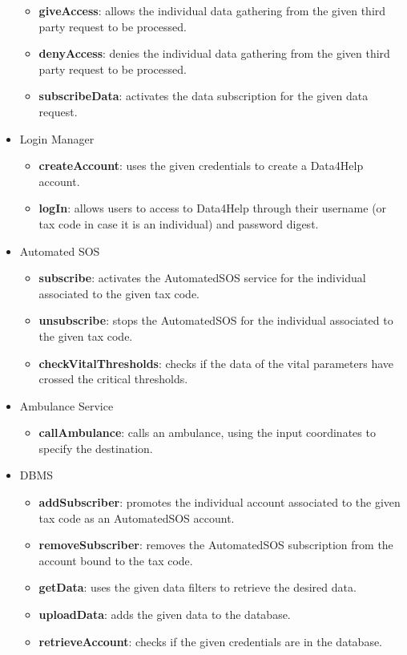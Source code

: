 \begin{itemize}
\begin{itemize}
\item \textbf{giveAccess}: allows the individual data gathering from the given third party request to be processed.
\item \textbf{denyAccess}: denies the individual data gathering from the given third party request to be processed.
\item \textbf{subscribeData}: activates the data subscription for the given data request.
\end{itemize}
\item Login Manager
\begin{itemize}
\item \textbf{createAccount}: uses the given credentials to create a Data4Help account.
\item \textbf{logIn}: allows users to access to Data4Help through their username (or tax code in case it is an individual) and password digest.
\end{itemize}
\item Automated SOS
\begin{itemize}
\item \textbf{subscribe}: activates the AutomatedSOS service for the individual associated to the given tax code.
\item \textbf{unsubscribe}: stops the AutomatedSOS for the individual associated to the given tax code.
\item \textbf{checkVitalThresholds}: checks if the data of the vital parameters have crossed the critical thresholds.
\end{itemize}
\item Ambulance Service
\begin{itemize}
\item \textbf{callAmbulance}: calls an ambulance, using the input coordinates to specify the destination.
\end{itemize}
\item DBMS
\begin{itemize}
\item \textbf{addSubscriber}: promotes the individual account associated to the given tax code as an AutomatedSOS account.
\item \textbf{removeSubscriber}: removes the AutomatedSOS subscription from the account bound to the tax code.
\item \textbf{getData}: uses the given data filters to retrieve the desired data.
\item \textbf{uploadData}: adds the given data to the database.
\item \textbf{retrieveAccount}: checks if the given credentials are in the database.

\end{itemize}
\end{itemize}
